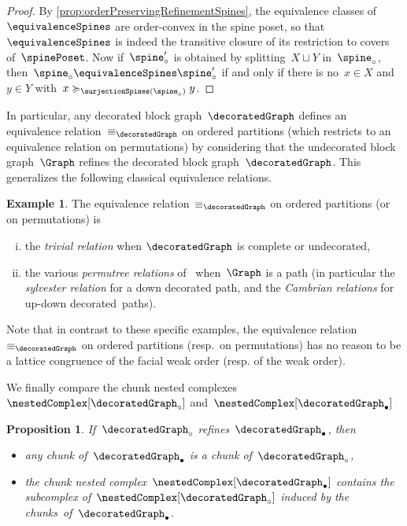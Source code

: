 \documentclass{amsart}
\newtheorem{proposition}[theorem]{Proposition}
\theoremstyle{definition}
\newtheorem{example}[theorem]{Example}
\newcommand{\darkblue}{\color{darkblue}} %
\newcommand{\defn}[1]{\textsl{\darkblue #1}} %
\begin{document}
\begin{proof}
  By \cref{prop:orderPreservingRefinementSpines}, the equivalence classes of~$\equivalenceSpines$ are order-convex in the spine poset, so that~$\equivalenceSpines$ is indeed the transitive closure of its restriction to covers of~$\spinePoset$.
  Now if~$\spine_\circ'$ is obtained by splitting~$X \sqcup Y$ in~$\spine_\circ$, then~$\spine_\circ \equivalenceSpines \spine_\circ'$ if and only if there is no~$x \in X$ and~$y \in Y$ with~${x \succcurlyeq_{\surjectionSpines(\spine_\circ)} y}$.
\end{proof}

In particular, any decorated block graph~$\decoratedGraph$ defines an equivalence relation~$\equiv_{\decoratedGraph}$ on ordered partitions (which restricts to an equivalence relation on permutations) by considering that the undecorated block graph~$\Graph$ refines the decorated block graph~$\decoratedGraph$.
This generalizes the following classical equivalence relations.

\begin{example}
  \label{exm:equivalenceRelations}
  The equivalence relation~$\equiv_{\decoratedGraph}$ on ordered partitions (or on permutations) is
  \begin{enumerate}[(i)]
    \item the \defn{trivial relation} when $\decoratedGraph$ is complete or undecorated,
    \item the various \defn{permutree relations} of~\cite{PilaudPons-permutrees} when~$\Graph$ is a path (in particular the \defn{sylvester relation} for a down decorated path, and the \defn{Cambrian relations} for up-down decorated~paths).
  \end{enumerate}
  Note that in contrast to these specific examples, the equivalence relation~$\equiv_{\decoratedGraph}$ on ordered partitions (resp.~on permutations) has no reason to be a lattice congruence of the facial weak order (resp. of the weak order).
\end{example}

We finally compare the chunk nested complexes~$\nestedComplex[\decoratedGraph_\circ]$ and~$\nestedComplex[\decoratedGraph_\bullet]$

\begin{proposition}
  \label{prop:refinementChunks}
  If~$\decoratedGraph_\circ$ refines~$\decoratedGraph_\bullet$, then
  \begin{itemize}
    \item any chunk of~$\decoratedGraph_\bullet$ is a chunk of~$\decoratedGraph_\circ$,
    \item the chunk nested complex~$\nestedComplex[\decoratedGraph_\bullet]$ contains the subcomplex of~$\nestedComplex[\decoratedGraph_\circ]$ induced by the chunks~of~$\decoratedGraph_\bullet$.
  \end{itemize}
\end{proposition}
\end{document}
